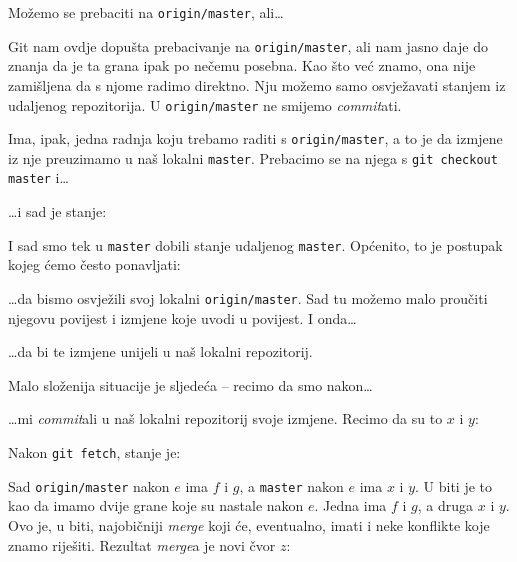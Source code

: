 
Možemo se prebaciti na \verb+origin/master+, ali\dots



Git nam ovdje dopušta prebacivanje na \verb+origin/master+, ali nam jasno daje do znanja da je ta grana ipak po nečemu posebna.
Kao što već znamo, ona nije zamišljena da s njome radimo direktno.
Nju možemo samo osvježavati stanjem iz udaljenog repozitorija.
U \verb+origin/master+ ne smijemo \emph{commit}ati.

Ima, ipak, jedna radnja koju trebamo raditi s \verb+origin/master+, a to je da izmjene iz nje preuzimamo u naš lokalni \verb+master+.
Prebacimo se na njega s \verb+git checkout master+ i\dots{}


\dots{}i sad je stanje:



I sad smo tek u \verb+master+ dobili stanje udaljenog \verb+master+.
Općenito, to je postupak kojeg ćemo često ponavljati:


\dots{}da bismo osvježili svoj lokalni \verb+origin/master+.
Sad tu možemo malo proučiti njegovu povijest i izmjene koje uvodi u povijest.
I onda\dots


\dots{}da bi te izmjene unijeli u naš lokalni repozitorij.

Malo složenija situacije je sljedeća -- recimo da smo nakon\dots{}



\dots{}mi \emph{commit}ali u naš lokalni repozitorij svoje izmjene. Recimo da su to $x$ i $y$:



Nakon \verb+git fetch+, stanje je:



Sad \verb+origin/master+ nakon $e$ ima $f$ i $g$, a \verb+master+ nakon $e$ ima $x$ i $y$.
U biti je to kao da imamo dvije grane koje su nastale nakon $e$. Jedna ima $f$ i $g$, a druga $x$ i $y$.
Ovo je, u biti, najobičniji \emph{merge} koji će, eventualno, imati i neke konflikte koje znamo riješiti.
Rezultat \emph{merge}a je novi čvor $z$:

